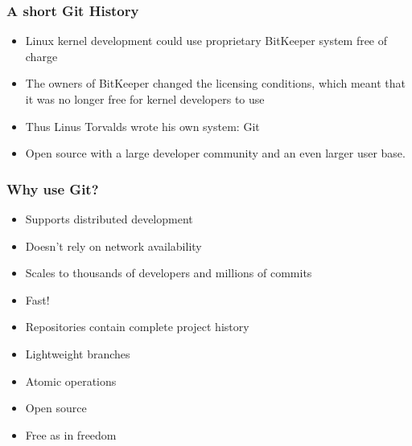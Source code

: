 \begin{frame}
\begin{itemize}
        \begin{itemize}
        \end{itemize}
\end{itemize}
\end{frame}

\begin{frame}
\frametitle{A short Git History}
\begin{itemize}
    \item Linux kernel development could use proprietary BitKeeper system
        free of charge
    \item The owners of BitKeeper changed the licensing conditions, which
        meant that it was no longer free for kernel developers to use
    \item Thus Linus Torvalds wrote his own system: Git
    \item Open source with a large developer community and an even larger
        user base.
\end{itemize}
\end{frame}

\begin{frame}
    \frametitle{Why use Git?}
    \begin{itemize}
        \item Supports distributed development
        \item Doesn't rely on network availability
        \item Scales to thousands of developers and millions of commits
        \item Fast!
        \item Repositories contain complete project history
        \item Lightweight branches
        \item Atomic operations
        \item Open source
        \item Free as in freedom
    \end{itemize}
\end{frame}


